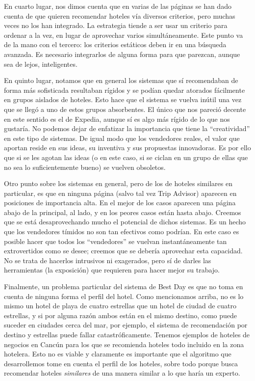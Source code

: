 \documentclass[12pt]{report}
\begin{document}
En cuarto lugar, nos dimos cuenta que en varias de las páginas se han dado cuenta de que quieren recomendar hoteles vía diversos criterios, pero muchas veces no los han integrado. La estrategia tiende a ser usar un criterio para ordenar a la vez, en lugar de aprovechar varios simultáneamente. Este punto va de la mano con el tercero: los criterios estáticos deben ir en una búsqueda avanzada. Es necesario integrarlos de alguna forma para que parezcan, aunque sea de lejos, inteligentes.

En quinto lugar, notamos que en general los sistemas que sí recomendaban de forma más sofisticada resultaban rígidos y se podían quedar atorados fácilmente en grupos aislados de hoteles. Esto hace que el sistema se vuelva inútil una vez que se llegó a uno de estos grupos absorbentes. El único que nos pareció decente en este sentido es el de Expedia, aunque sí es algo más rígido de lo que nos gustaría. No podemos dejar de enfatizar la importancia que tiene la ``creatividad'' en este tipo de sistemas. De igual modo que los vendedores reales, el valor que aportan reside en sus ideas, su inventiva y sus propuestas innovadoras. Es por ello que si se les agotan las ideas (o en este caso, si se ciclan en un grupo de ellas que no sea lo suficientemente bueno) se vuelven obsoletos.

Otro punto sobre los sistemas en general, pero de los de hoteles similares en particular, es que en ninguna página (salvo tal vez Trip Advisor) aparecen en posiciones de importancia alta. En el mejor de los casos aparecen una página abajo de la principal, al lado, y en los peores casos están hasta abajo. Creemos que se está desaprovechando mucho el potencial de dichos sistemas. Es un hecho que los vendedores tímidos no son tan efectivos como podrían. En este caso es posible hacer que todos los ``vendedores'' se vuelvan instantáneamente tan extrovertidos como se desee; creemos que se debería aprovechar esta capacidad. No se trata de hacerlos intrusivos ni exagerados, pero sí de darles las herramientas (la exposición) que requieren para hacer mejor su trabajo.

Finalmente, un problema particular del sistema de Best Day es que no toma en cuenta de ninguna forma el perfil del hotel. Como mencionamos arriba, no es lo mismo un hotel de playa de cuatro estrellas que un hotel de ciudad de cuatro estrellas, y si por alguna razón ambos están en el mismo destino, como puede suceder en ciudades cerca del mar, por ejemplo, el sistema de recomendación por destino y estrellas puede fallar catastróficamente. Tenemos ejemplos de hoteles de negocios en Cancún para los que se recomienda hoteles todo incluido en la zona hotelera. Esto no es viable y claramente es importante que el algoritmo que desarrollemos tome en cuenta el perfil de los hoteles, sobre todo porque busca recomendar hoteles \emph{similares} de una manera similar a lo que haría un experto.
\end{document}
